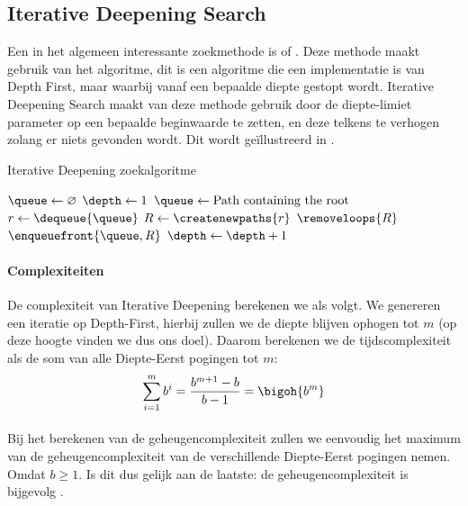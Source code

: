 \subsection{Iterative Deepening Search}
Een in het algemeen interessante zoekmethode is  of . Deze methode maakt gebruik van het  algoritme, dit is een algoritme die een implementatie is van Depth First, maar waarbij vanaf een bepaalde diepte gestopt wordt. Iterative Deepening Search maakt van deze methode gebruik door de diepte-limiet parameter op een bepaalde beginwaarde te zetten, en deze telkens te verhogen zolang er niets gevonden wordt. Dit wordt ge\"illustreerd in .
\begin{algorithm}[htb]                      %
\caption{Iterative Deepening zoekalgoritme}          %
\label{alg:iterativeDeepening}                           %
\begin{algorithmic}[1]                    %
\STATE $\queue\leftarrow\varnothing$
\STATE $\depth\leftarrow1$
\WHILE{$\neg\goalreached{\queue}$}
\STATE{}
\STATE $\queue\leftarrow\mbox{Path containing the root}$
\WHILE{$\notempty{\queue}\wedge\neg\goalreached{\queue}$}
\STATE $r\leftarrow\dequeue{\queue}$
\STATE $R\leftarrow\createnewpaths{r}$
\STATE $\removeloops{R}$
\STATE $\enqueuefront{\queue,R}$
\ENDIF
\ENDWHILE
\STATE{}
\STATE $\depth\leftarrow\depth+1$
\ENDWHILE
\end{algorithmic}
\end{algorithm}
\paragraph{Complexiteiten}
De complexiteit van Iterative Deepening berekenen we als volgt. We genereren een iteratie op Depth-First, hierbij zullen we de diepte blijven ophogen tot $m$ (op deze hoogte vinden we dus ons doel). Daarom berekenen we de tijdscomplexiteit als de som van alle Diepte-Eerst pogingen tot $m$:
\begin{equation}
\displaystyle\sum_{i=1}^m{b^i}=\displaystyle\frac{b^{m+1}-b}{b-1}=\bigoh{b^m}
\end{equation}
\paragraph{}
Bij het berekenen van de geheugencomplexiteit zullen we eenvoudig het maximum van de geheugencomplexiteit van de verschillende Diepte-Eerst pogingen nemen. Omdat $b\geq1$. Is dit dus gelijk aan de laatste: de geheugencomplexiteit is bijgevolg .
